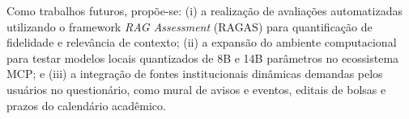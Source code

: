 \documentclass[12pt]{article}
\begin{document}
Como trabalhos futuros, propõe-se: (i) a realização de avaliações automatizadas utilizando o framework \textit{RAG Assessment} (RAGAS) para quantificação de fidelidade e relevância de contexto; (ii) a expansão do ambiente computacional para testar modelos locais quantizados de 8B e 14B parâmetros no ecossistema MCP; e (iii) a integração de fontes institucionais dinâmicas demandas pelos usuários no questionário, como mural de avisos e eventos, editais de bolsas e prazos do calendário acadêmico.





\end{document}
